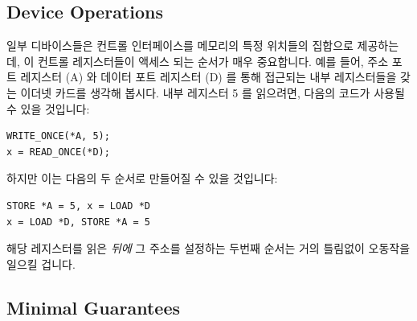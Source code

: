 \subsection{Device Operations}
\label{sec:advsync:Device Operations}

일부 디바이스들은 컨트롤 인터페이스를 메모리의 특정 위치들의 집합으로
제공하는데, 이 컨트롤 레지스터들이 액세스 되는 순서가 매우 중요합니다.
예를 들어, 주소 포트 레지스터 (A) 와 데이터 포트 레지스터 (D) 를 통해 접근되는
내부 레지스터들을 갖는 이더넷 카드를 생각해 봅시다.
내부 레지스터 5 를 읽으려면, 다음의 코드가 사용될 수 있을 것입니다:

\vspace{5pt}
\begin{minipage}[t]{\columnwidth}
\scriptsize
\begin{verbatim}
WRITE_ONCE(*A, 5);
x = READ_ONCE(*D);
\end{verbatim}
\vspace{1pt}
\end{minipage}
%
하지만 이는 다음의 두 순서로 만들어질 수 있을 것입니다:

\vspace{5pt}
\begin{minipage}[t]{\columnwidth}
\scriptsize
\begin{verbatim}
STORE *A = 5, x = LOAD *D
x = LOAD *D, STORE *A = 5
\end{verbatim}
\vspace{1pt}
\end{minipage}
%
해당 레지스터를 읽은 \emph{뒤에} 그 주소를 설정하는 두번째 순서는 거의 틀림없이
오동작을 일으킬 겁니다.

\subsection{Minimal Guarantees}
\label{sec:advsync:Minimal Guarantees}

